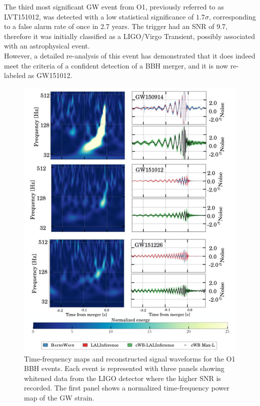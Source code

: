 \documentclass[binding=0.6cm, LaM]{sapthesis}
\begin{document}
	The third most significant GW event from O1, previously referred to as LVT151012,
	was detected with a low statistical significance of $1.7\sigma$, 
	corresponding to a false alarm rate of once in 2.7 years. 
	The trigger had an SNR of 9.7, therefore it was initially classified as a LIGO/Virgo Transient, 
	possibly associated with an astrophysical event. \\
	However, a detailed re-analysis of this event has demonstrated that it does indeed 
	meet the criteria of a confident detection of a BBH merger, and it is now re-labeled as GW151012.
                \begin{figure}[H]
                        \label{o1}
                        \includegraphics[scale=0.45]{o1}
                        \centering
                        \caption{Time-frequency maps and reconstructed signal waveforms for the O1 BBH events.
                                      Each event is represented with three panels showing whitened data
                                      from the LIGO detector where the higher SNR is recorded.
                                      The first panel shows a normalized time-frequency power map of the GW strain.
}
\end{figure}
\end{document}
